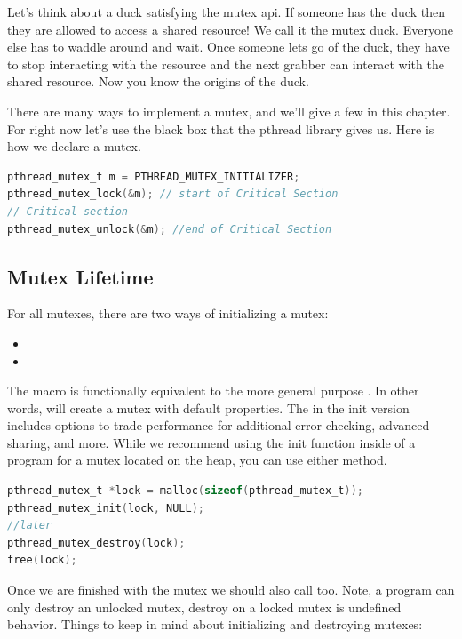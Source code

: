 Let's think about a duck satisfying the mutex api. If someone has the duck then they are allowed to access a shared resource! We call it the mutex duck. Everyone else has to waddle around and wait. Once someone lets go of the duck, they have to stop interacting with the resource and the next grabber can interact with the shared resource. Now you know the origins of the duck.

There are many ways to implement a mutex, and we'll give a few in this chapter.
For right now let's use the black box that the pthread library gives us.
Here is how we declare a mutex.

\begin{lstlisting}[language=C]
pthread_mutex_t m = PTHREAD_MUTEX_INITIALIZER;
pthread_mutex_lock(&m); // start of Critical Section
// Critical section
pthread_mutex_unlock(&m); //end of Critical Section
\end{lstlisting}

\subsection{Mutex Lifetime}

For all mutexes, there are two ways of initializing a mutex:
\begin{itemize}
\item{}
\item{}
\end{itemize}
The macro  is functionally equivalent to the more general purpose .
In other words,  will create a mutex with default properties.
The  in the init version includes options to trade performance for additional error-checking, advanced sharing, and more.
While we recommend using the init function inside of a program for a mutex located on the heap, you can use either method.

\begin{lstlisting}[language=C]
pthread_mutex_t *lock = malloc(sizeof(pthread_mutex_t));
pthread_mutex_init(lock, NULL);
//later
pthread_mutex_destroy(lock);
free(lock);
\end{lstlisting}

Once we are finished with the mutex we should also call  too.
Note, a program can only destroy an unlocked mutex, destroy on a locked mutex is undefined behavior.
Things to keep in mind about initializing and destroying mutexes:

